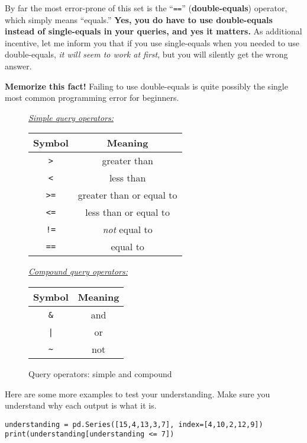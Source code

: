 
By far the most error-prone of this set is the ``\texttt{==}''
(\textbf{double-equals}) operator, which simply means ``equals.'' \textbf{Yes,
you do have to use double-equals instead of single-equals in your queries, and
yes it matters.} As additional incentive, let me inform you that if you use
single-equals when you needed to use double-equals, \textit{it will seem to
work at first}, but you will silently get the wrong answer.

\textbf{Memorize this fact!} Failing to use double-equals is quite possibly the
single most common programming error for beginners.

\begin{figure}[ht]
\centering
\small
\bigskip
\underline{\textit{Simple query operators:}}\\
\smallskip
\begin{tabular}{c|c}
Symbol & Meaning \\
\hline
\texttt{>} & greater than \\
\hline
\texttt{<} & less than \\
\hline
\texttt{>=} & greater than or equal to \\
\hline
\texttt{<=} & less than or equal to \\
\hline
\texttt{!=} & \textit{not} equal to \\
\hline
\texttt{==} & equal to \\
\end{tabular}

\bigskip
\bigskip
\underline{\textit{Compound query operators:}}\\
\smallskip
\begin{tabular}{c|c}
Symbol & Meaning \\
\hline
\texttt{\&} & and \\
\hline
\texttt{|} & or \\
\hline
\texttt{\textasciitilde} & not \\
\end{tabular}

\bigskip
\normalsize
\caption{Query operators: simple and compound}
\label{fig:queryOps}
\end{figure}


Here are some more examples to test your understanding. Make sure you
understand why each output is what it is.

\begin{Verbatim}[fontsize=\small,samepage=true,frame=single,framesep=3mm]
understanding = pd.Series([15,4,13,3,7], index=[4,10,2,12,9])
print(understanding[understanding <= 7])
\end{Verbatim}
\vspace{-.3in}

